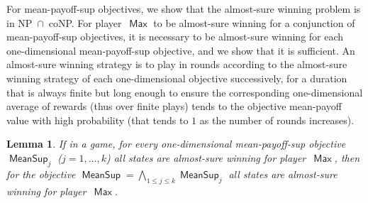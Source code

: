 \documentclass{article}
\newtheorem{lemma}{Lemma}
\DeclareMathOperator{\ma}{\mathsf{Max}}
\newcommand{\MeanSup}{\operatorname{\mathsf{MeanSup}}}
\begin{document}
For mean-payoff-sup objectives, we show that the almost-sure winning problem
is in NP~$\cap$~coNP. For player~$\ma$ to be almost-sure winning for a conjunction
of mean-payoff-sup objectives, it is necessary to be almost-sure winning for
each one-dimensional mean-payoff-sup objective, and we show that it is sufficient.
An almost-sure winning strategy is to play in rounds according to the almost-sure winning
strategy of each one-dimensional objective successively, for a duration that
is always finite but long enough to ensure the corresponding one-dimensional 
average of rewards (thus over finite plays) tends to the objective mean-payoff value
with high probability (that tends to $1$ as the number of rounds increases).

\begin{lemma}\label{lem:all-one}
If in a game, for every one-dimensional mean-payoff-sup objective $\MeanSup_j$ ($j=1,\dots,k$)
all states are almost-sure winning for player~$\ma$,
then for the objective $\MeanSup = \bigwedge_{1 \leq j  \leq k} \MeanSup_j$ 
all states are almost-sure winning for player~$\ma$.
\end{lemma}
\end{document}
